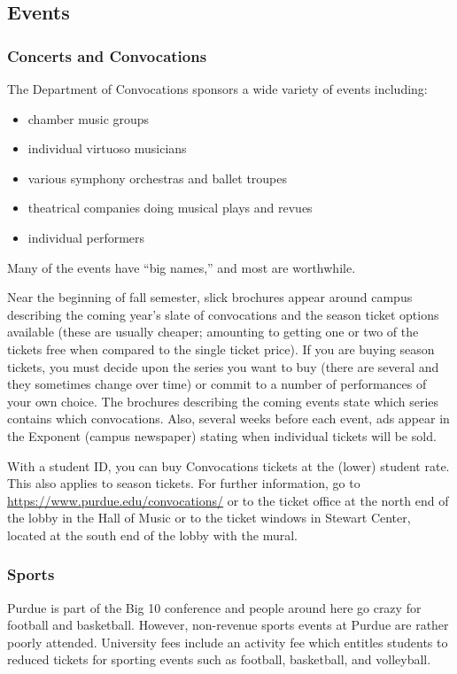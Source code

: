 \subsection{Events}


\subsubsection{Concerts and Convocations}
The Department of Convocations sponsors a wide variety of events including:

\begin{itemize}
	\item chamber music groups
	\item individual virtuoso musicians
	\item various symphony orchestras and ballet troupes
	\item theatrical companies doing musical plays and revues
	\item individual performers
\end{itemize}

Many of the events have ``big names,'' and most are worthwhile.

Near the beginning of fall semester, slick brochures appear around campus describing the coming year's slate of convocations and the season ticket options available (these are usually cheaper; amounting to getting one or two of the tickets free when compared to the single ticket price). If you are buying season tickets, you must decide upon the series you want to buy (there are several and they sometimes change over time) or commit to a number of performances of your own choice. The brochures describing the coming events state which series contains which convocations. Also, several weeks before each event, ads appear in the Exponent (campus newspaper) stating when individual tickets will be sold.

With a student ID, you can buy Convocations tickets at the (lower) student rate. This also applies to season tickets. For further information, go to \url{https://www.purdue.edu/convocations/} or to the ticket office at the north end of the lobby in the Hall of Music or to the ticket windows in Stewart Center, located at the south end of the lobby with the mural.




\subsubsection{Sports}
Purdue is part of the Big 10 conference and people around here go crazy for football and basketball. However, non-revenue sports events at Purdue are rather poorly attended. University fees include an activity fee which entitles students to reduced tickets for sporting events such as football, basketball, and volleyball.

